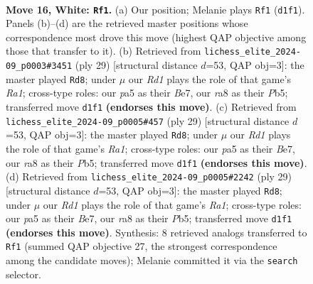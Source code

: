 \documentclass[11pt]{article}
\begin{document}
\clearpage

\begin{figure}[p]\centering
\begin{subfigure}{0.46\textwidth}\centering
\resizebox{\linewidth}{!}{%
\newchessgame
\chessboard[
  setfen={rnb3r1/1p3ppp/1k2pn2/pNb5/P6P/1B2P3/1P1B1PP1/RN1R2K1 w - - 9 16},
  showmover=false,
  pgfstyle=straightmove, color=movearrow, markmove={d1-f1}
]}
\caption{}
\end{subfigure}\hfill
\begin{subfigure}{0.46\textwidth}\centering
\resizebox{\linewidth}{!}{%
\newchessgame
\chessboard[
  setfen={r3k2r/2p1bppp/p3b3/1pn1P3/8/5N2/PPB2PPP/R1BR2K1 b kq - 0 15},
  showmover=false,
  pgfstyle=straightmove, color=movearrow, markmove={a8-d8}
]}
\caption{}
\end{subfigure}
\\[4pt]
\begin{subfigure}{0.46\textwidth}\centering
\resizebox{\linewidth}{!}{%
\newchessgame
\chessboard[
  setfen={r3k2r/2p1bppp/p3b3/1pn1P3/8/5N2/PPB2PPP/R1BR2K1 b kq - 0 15},
  showmover=false,
  pgfstyle=straightmove, color=movearrow, markmove={a8-d8}
]}
\caption{}
\end{subfigure}\hfill
\begin{subfigure}{0.46\textwidth}\centering
\resizebox{\linewidth}{!}{%
\newchessgame
\chessboard[
  setfen={r3k2r/2p1bppp/p3b3/1pn1P3/8/5N2/PPB2PPP/R1BR2K1 b kq - 0 15},
  showmover=false,
  pgfstyle=straightmove, color=movearrow, markmove={a8-d8}
]}
\caption{}
\end{subfigure}
\caption{\textbf{Move 16, White: \texttt{Rf1}.} (a) Our position; Melanie plays \texttt{Rf1} (\texttt{d1f1}). Panels (b)--(d) are the retrieved master positions whose correspondence most drove this move (highest QAP objective among those that transfer to it). (b) Retrieved from \texttt{lichess\_elite\_2024-09\_p0003\#3451} (ply 29) [structural distance $d$=53, QAP obj=3]: the master played \texttt{Rd8}; under $\mu$ our \emph{Rd1} plays the role of that game's \emph{Ra1}; cross-type roles: our \emph{p}a5 as their \emph{B}e7, our \emph{r}a8 as their \emph{P}b5; transferred move \texttt{d1f1} \textbf{(endorses this move)}. (c) Retrieved from \texttt{lichess\_elite\_2024-09\_p0005\#457} (ply 29) [structural distance $d$=53, QAP obj=3]: the master played \texttt{Rd8}; under $\mu$ our \emph{Rd1} plays the role of that game's \emph{Ra1}; cross-type roles: our \emph{p}a5 as their \emph{B}e7, our \emph{r}a8 as their \emph{P}b5; transferred move \texttt{d1f1} \textbf{(endorses this move)}. (d) Retrieved from \texttt{lichess\_elite\_2024-09\_p0005\#2242} (ply 29) [structural distance $d$=53, QAP obj=3]: the master played \texttt{Rd8}; under $\mu$ our \emph{Rd1} plays the role of that game's \emph{Ra1}; cross-type roles: our \emph{p}a5 as their \emph{B}e7, our \emph{r}a8 as their \emph{P}b5; transferred move \texttt{d1f1} \textbf{(endorses this move)}. Synthesis: 8 retrieved analogs transferred to \texttt{Rf1} (summed QAP objective 27, the strongest correspondence among the candidate moves); Melanie committed it via the \texttt{search} selector.}
\label{fig:thought-m30}
\end{figure}
\end{document}
